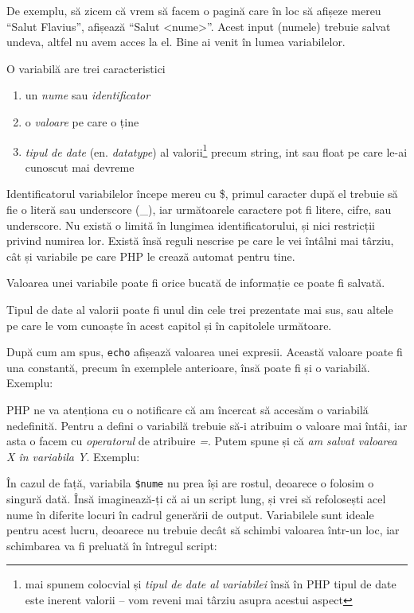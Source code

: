 De exemplu, să zicem că vrem să facem o pagină care în loc să afișeze
mereu ``Salut Flavius'', afișează ``Salut <nume>''. Acest input (numele) trebuie
salvat undeva, altfel nu avem acces la el. Bine ai venit în lumea variabilelor.

O variabilă are trei caracteristici
\begin{enumerate}
\item un \textsl{nume} sau \textsl{identificator}
\item o \textsl{valoare} pe care o ține
\item \textsl{tipul de date} (en. \textsl{datatype}) al valorii\footnote{mai
spunem colocvial și \textit{tipul de date al variabilei} însă în PHP tipul
de date este inerent valorii -- vom reveni mai târziu asupra acestui aspect} precum
string, int sau float pe care le-ai cunoscut mai devreme
\end{enumerate}

Identificatorul variabilelor începe mereu cu \$, primul caracter după el
trebuie să fie o literă sau underscore (\_), iar următoarele
caractere pot fi litere, cifre, sau underscore.
Nu există o limită în lungimea identificatorului, și nici restricții privind
numirea lor. Există însă reguli nescrise pe care le vei întâlni mai târziu,
cât și variabile pe care PHP le crează automat pentru tine.

Valoarea unei variabile poate fi orice bucată de informație ce poate
fi salvată.

Tipul de date al valorii poate fi unul din cele trei prezentate mai sus,
sau altele pe care le vom cunoaște în acest capitol și în capitolele următoare.

După cum am spus, \texttt{echo} afișează valoarea unei expresii.
Această valoare poate fi una constantă, precum în exemplele anterioare,
însă poate fi și o variabilă. Exemplu:

PHP ne va atenționa cu o notificare că am încercat să accesăm o variabilă
nedefinită. Pentru a defini o variabilă trebuie să-i atribuim o valoare
mai întâi, iar asta o facem cu \textsl{operatorul} de atribuire \textsl{=}.
Putem spune și că \textit{am salvat valoarea X în variabila Y}. Exemplu:



În cazul de față, variabila \texttt{\$nume} nu prea își are rostul, deoarece o
folosim o singură dată. Însă imaginează-ți că ai un script lung,
și vrei să refolosești acel nume în diferite locuri în cadrul generării de
output. Variabilele sunt ideale pentru acest lucru, deoarece nu trebuie
decât să schimbi valoarea într-un loc, iar schimbarea va fi preluată în
întregul script:


